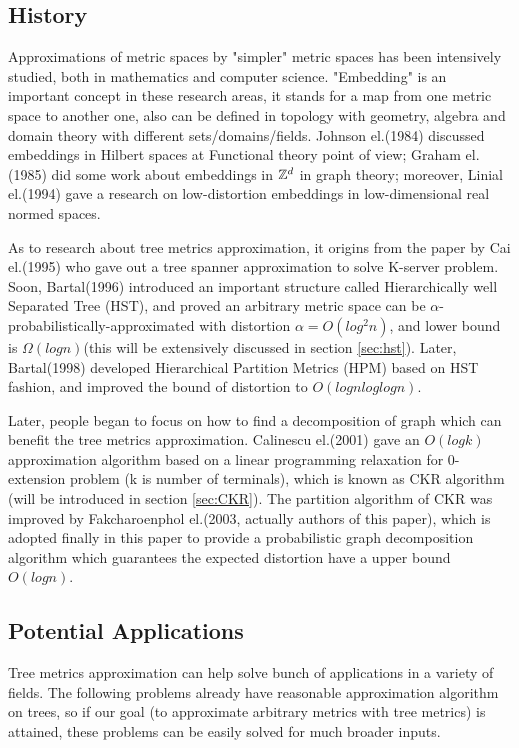 \documentclass[11pt,twoside, onecolumn]{IEEEtran}
\begin{document}
\subsection{History}
Approximations of metric spaces by "simpler" metric spaces has been intensively studied, both in
mathematics and computer science. 
"Embedding" is an important concept in these research areas,
it stands for a map from one metric space to another one, 
also can be defined in topology with geometry, algebra and domain theory with different sets/domains/fields. Johnson el.(1984)\cite{hilbert} discussed embeddings in Hilbert spaces at Functional
theory point of view; Graham el.(1985)\cite{zd} did some work about embeddings in ${\mathbb{Z}}^d$ in graph theory; moreover,
Linial el.(1994)\cite{realnorm} gave a research on low-distortion embeddings in low-dimensional real normed spaces.

As to research about tree metrics approximation, it origins from the paper by Cai el.(1995)\cite{Cai}
who gave out a tree spanner approximation to solve K-server problem. Soon, Bartal(1996)\cite{hst} introduced
an important structure called Hierarchically well Separated Tree (HST), and proved an arbitrary metric 
space can be $\alpha$-probabilistically-approximated with distortion $\alpha=O(log^2n)$, and lower bound is
$\Omega(logn)$(this will be extensively discussed in section \ref{sec:hst}). Later, Bartal(1998)\cite{bartal98}
developed Hierarchical Partition Metrics (HPM) based on HST fashion, and improved the bound of distortion
to $O(lognloglogn)$. 

Later, people began to focus on how to find a decomposition of graph which can 
benefit the tree metrics approximation. Calinescu el.(2001)\cite{CKR} gave an $O(logk)$ approximation
algorithm based on a linear programming relaxation for 0-extension problem (k is number of terminals), which is known as
CKR algorithm (will be introduced in section \ref{sec:CKR}). The partition algorithm of CKR
was improved by Fakcharoenphol el.(2003, actually authors of this paper)\cite{thispaper}, which is adopted finally
in this paper to provide a probabilistic graph decomposition algorithm which guarantees the expected distortion
have a upper bound $O(logn)$.

\subsection{Potential Applications}
\label{sec:potential}
Tree metrics approximation can help solve bunch of applications in a variety of fields. The following
problems already have reasonable approximation algorithm on trees, so if our goal (to approximate
arbitrary metrics with tree metrics) is attained, these problems can be easily solved for much broader
inputs.
\end{document}
